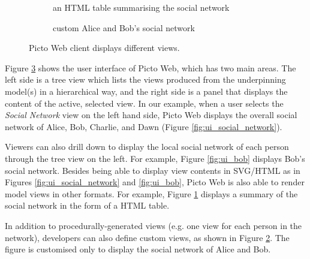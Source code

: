 \documentclass[preprint,12pt, a4paper]{elsarticle}
\begin{document}
\begin{figure}[h]
\begin{subfigure}{0.49\textwidth}
    \caption{an HTML table summarising the social network}
    \label{fig:ui_tabular}
  \end{subfigure}
  \hfill
  \begin{subfigure}{0.49\textwidth}
    \caption{custom Alice and Bob's social network}
    \label{fig:ui_custom}
  \end{subfigure}
  \hfill
  \caption{Picto Web client displays different views.}
  \label{fig:ui}
\end{figure}

Figure \ref{fig:ui} shows the user interface of Picto Web, which has two main areas. The left side is a tree view which lists the views produced from the underpinning model(s) in a hierarchical way, and the right side is a panel that displays the content of the active, selected view. In our example, when a user selects the \emph{Social Network} view on the left hand side, Picto Web displays the overall social network of Alice, Bob, Charlie, and Dawn (Figure \ref{fig:ui_social_network}). 

Viewers can also drill down to display the local social network of each person through the tree view on the left. For example, Figure \ref{fig:ui_bob} displays Bob's social network. Besides being able to display view contents in SVG/HTML as in Figures \ref{fig:ui_social_network} and \ref{fig:ui_bob}, Picto Web is also able to render model views in other formats. For example, Figure \ref{fig:ui_tabular} displays a summary of the social network in the form of a HTML table. 

In addition to procedurally-generated views (e.g. one view for each person in the network), developers can also define custom views, as shown in Figure \ref{fig:ui_custom}. The figure is customised only to display the social network of Alice and Bob. 
\end{document}
